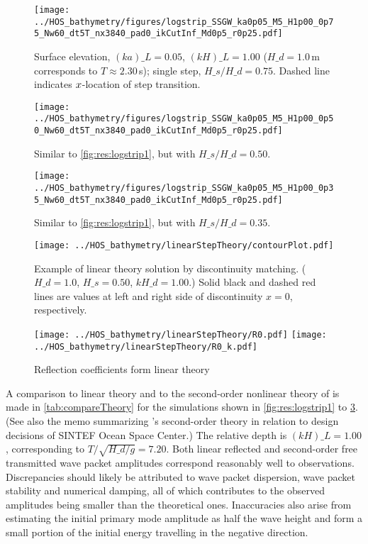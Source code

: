 \begin{figure}[h!ptb]%
\centering
\texttt{[image: ../HOS\_bathymetry/figures/logstrip\_SSGW\_ka0p05\_M5\_H1p00\_0p75\_Nw60\_dt5T\_nx3840\_pad0\_ikCutInf\_Md0p5\_r0p25.pdf]}%
\caption{Surface elevation, $(ka)\_L = 0.05$, $(kH)\_L = 1.00$ ($H\_d=1.0$\,m corresponds to $T\approx2.30$\,s); single step, $H\_s/H\_d = 0.75$. Dashed line indicates $x$-location of step transition.}%
\label{fig:res:logstrip1}%
\end{figure}
\begin{figure}[h!ptb]%
\centering 
\texttt{[image: ../HOS\_bathymetry/figures/logstrip\_SSGW\_ka0p05\_M5\_H1p00\_0p50\_Nw60\_dt5T\_nx3840\_pad0\_ikCutInf\_Md0p5\_r0p25.pdf]}%
\caption{Similar to \autoref{fig:res:logstrip1}, but with $H\_s/H\_d = 0.50$.}%
\label{fig:res:logstrip2}%
\end{figure}
\begin{figure}[h!ptb]%
\centering 															  
\texttt{[image: ../HOS\_bathymetry/figures/logstrip\_SSGW\_ka0p05\_M5\_H1p00\_0p35\_Nw60\_dt5T\_nx3840\_pad0\_ikCutInf\_Md0p5\_r0p25.pdf]}%
\caption{Similar to \autoref{fig:res:logstrip1}, but with $H\_s/H\_d = 0.35$.}%
\label{fig:res:logstrip3}%
\end{figure}


\begin{figure}[h!ptb]%
\centering
\texttt{[image: ../HOS\_bathymetry/linearStepTheory/contourPlot.pdf]}%
\caption{Example of linear theory solution by discontinuity matching. ($H\_d = 1.0$, $H\_s = 0.50$, $kH\_d = 1.00$.) Solid black and dashed red lines are values at left and right side of discontinuity $x=0$, respectively.}%
\label{fig:linearReflection:contour}%
\end{figure}

\begin{figure}[h!ptb]%
\centering
\texttt{[image: ../HOS\_bathymetry/linearStepTheory/R0.pdf]}%
\texttt{[image: ../HOS\_bathymetry/linearStepTheory/R0\_k.pdf]}%
\caption{Reflection coefficients form linear theory}%
\label{fig:linearReflection:R0}%
\end{figure}



A comparison to linear theory and to the second-order nonlinear theory of \citet{li_2021_step1} is made in \autoref{tab:compareTheory} for the simulations shown in \autoref{fig:res:logstrip1} to \ref{fig:res:logstrip3}.
(See also the memo \citet{AHA_2021_LiTheory} summarizing \citeauthor{li_2021_step1}'s second-order theory in relation to design decisions of SINTEF Ocean Space Center.)
The relative depth is $(kH)\_L=1.00$,  corresponding to $T/\sqrt{H\_d/g}=7.20$.
Both linear reflected and second-order free transmitted wave packet amplitudes correspond reasonably well to observations.
Discrepancies should likely be attributed to wave packet dispersion, wave packet stability and numerical damping, all of which contributes to the observed amplitudes being smaller than the theoretical ones.
Inaccuracies also arise from estimating the initial primary mode amplitude as half the wave height and form a small portion of the initial energy travelling in the negative direction.


